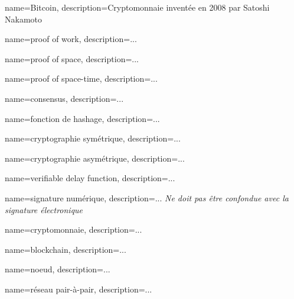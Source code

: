 {
    name=Bitcoin,
    description={Cryptomonnaie inventée en 2008 par Satoshi Nakamoto}
}

{
    name=proof of work,
    description={...}
}

{
    name=proof of space,
    description={...}
}

{
    name=proof of space-time,
    description={...}
}

{
    name=consensus,
    description={...}
}

{
    name=fonction de hashage,
    description={...}
}

{
    name=cryptographie symétrique,
    description={...}
}

{
    name=cryptographie asymétrique,
    description={...}
}

{
    name=verifiable delay function,
    description={...}
}

{
    name=signature numérique,
    description={... \textit{Ne doit pas être confondue avec la signature électronique}}
}

{
    name=cryptomonnaie,
    description={...}
}

{
    name=blockchain,
    description={...}
}

{
    name=noeud,
    description={...}
}

{
    name=réseau pair-à-pair,
    description={...}
}